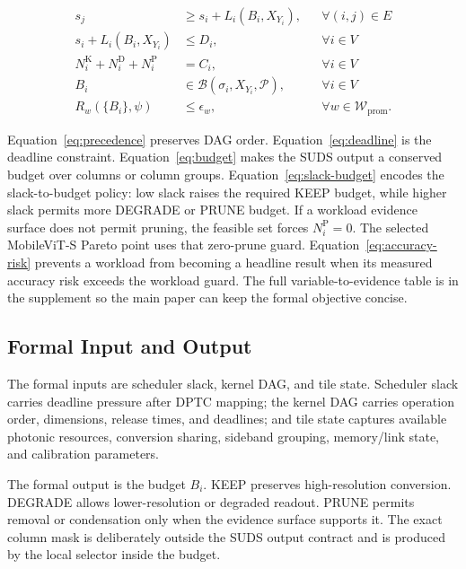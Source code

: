 \documentclass[10pt,journal]{IEEEtran}
\begin{document}
\begin{align}
s_j &\ge s_i + L_i(B_i,X_{Y_i}), && \forall (i,j)\in E \label{eq:precedence}\\
s_i + L_i(B_i,X_{Y_i}) &\le D_i, && \forall i \in V \label{eq:deadline}\\
N_i^{\mathrm{K}}+N_i^{\mathrm{D}}+N_i^{\mathrm{P}} &= C_i, && \forall i \in V \label{eq:budget}\\
B_i &\in \mathcal{B}(\sigma_i,X_{Y_i},\mathcal{P}), && \forall i \in V \label{eq:slack-budget}\\
R_w(\{B_i\},\psi) &\le \epsilon_w, && \forall w \in \mathcal{W}_{\mathrm{prom}} .
\label{eq:accuracy-risk}
\end{align}

Equation~\ref{eq:precedence} preserves DAG order.
Equation~\ref{eq:deadline} is the deadline constraint.
Equation~\ref{eq:budget} makes the SUDS output a conserved budget over
columns or column groups.
Equation~\ref{eq:slack-budget} encodes the slack-to-budget policy: low slack
raises the required KEEP budget, while higher slack permits more DEGRADE or
PRUNE budget. If a workload evidence surface does not permit pruning, the
feasible set forces \(N_i^{\mathrm{P}}=0\). The selected MobileViT-S Pareto
point uses that zero-prune guard.
Equation~\ref{eq:accuracy-risk} prevents a workload from becoming a headline
result when its measured accuracy risk exceeds the workload guard. The full
variable-to-evidence table is in the supplement so the main paper can keep the
formal objective concise.

\subsection{Formal Input and Output}

The formal inputs are scheduler slack, kernel DAG, and tile state. Scheduler
slack carries deadline pressure after DPTC mapping; the kernel DAG carries
operation order, dimensions, release times, and deadlines; and tile state
captures available photonic resources, conversion sharing, sideband grouping,
memory/link state, and calibration parameters.

The formal output is the budget \(B_i\). KEEP preserves high-resolution
conversion. DEGRADE allows lower-resolution or degraded readout. PRUNE permits
removal or condensation only when the evidence surface supports it. The exact
column mask is deliberately outside the SUDS output contract and is produced by
the local selector inside the budget.
\end{document}
